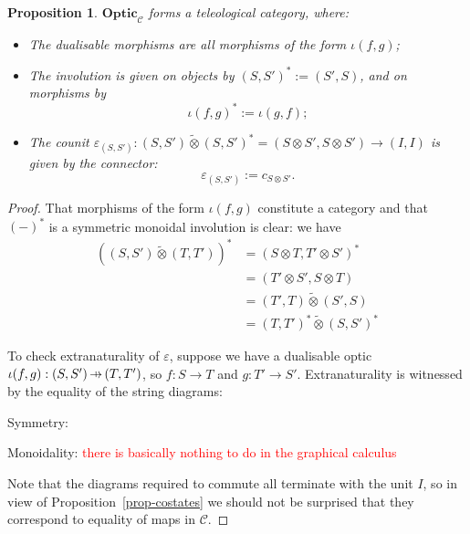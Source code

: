 \documentclass[11pt,a4paper]{article}
\theoremstyle{plain}
\newtheorem{proposition}[theorem]{Proposition}
\theoremstyle{definition}
\newcommand{\C}{\mathscr{C}}
\newcommand{\Optic}{\mathbf{Optic}}
\newcommand{\switched}{\mathbin{\tilde{\otimes}}}
\newcommand{\hto}{\ensuremath{\,\mathaccent\shortmid\rightarrow\,}}
\newcommand{\todo}[1]{\textcolor{red}{\small #1}}
\begin{document}
\begin{proposition}
  $\Optic_\C$ forms a teleological category, where:
  \begin{itemize}
  \item The dualisable morphisms are all morphisms of the form $\iota(f, g)$;
  \item The involution is given on objects by ${(S, S')}^* := (S', S)$, and on morphisms by \[\iota{(f, g)}^* := \iota(g, f);\]
  \item The counit $\varepsilon_{(S, S')} : (S, S') \switched {(S, S')}^* = (S \otimes S', S \otimes S') \to (I, I)$ is given by the connector: \[\varepsilon_{(S, S')} := c_{S \otimes S'}.\]
  \end{itemize}
\end{proposition}
\begin{proof}
  That morphisms of the form $\iota(f, g)$ constitute a category and that ${(-)}^*$ is a symmetric monoidal involution is clear: we have
  \begin{align*}
    \left( (S, S') \switched (T, T') \right)^*
    &= \left( S \otimes T, T' \otimes S' \right)^* \\
    &= \left(T' \otimes S', S \otimes T  \right) \\
    &= (T', T) \switched (S', S) \\
    &= (T, T')^* \switched (S, S')^*
  \end{align*}

  To check extranaturality of $\varepsilon$, suppose we have a dualisable optic $\iota(f, g) : (S, S') \hto (T, T')$, so $f : S \to T$ and $g : T' \to S'$. Extranaturality is witnessed by the equality of the string diagrams:
  \begin{center}
    
    \qquad \raisebox{1.5cm}{$=$} \qquad
    
  \end{center}
  Symmetry:
  \begin{center}
    
    \qquad \raisebox{1.5cm}{$=$} \qquad
    
  \end{center}
  Monoidality: \todo{there is basically nothing to do in the graphical calculus}

  Note that the diagrams required to commute all terminate with the unit $I$, so in view of Proposition~\ref{prop-costates} we should not be surprised that they correspond to equality of maps in $\C$.
\end{proof}
\end{document}
